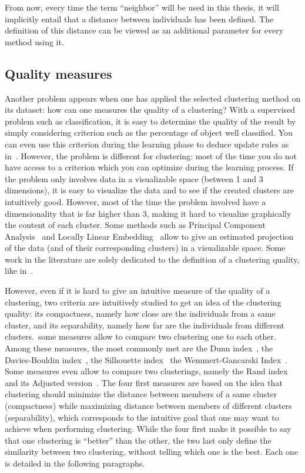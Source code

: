     From now, every time the term ``neighbor'' will be used in this thesis, it will implicitly entail that a distance between individuals has been defined. The definition of this distance can be viewed as an additional parameter for every method using it.

    \subsection{Quality measures}
\label{sec:quality_measures}
    Another problem appears when one has applied the selected clustering method on its dataset: how can one measures the quality of a clustering? With a supervised problem such as classification, it is easy to determine the quality of the result by simply considering criterion such as the percentage of object well classified. You can even use this criterion during the learning phase to deduce update rules as in~\cite{vincent2010stacked}. However, the problem is different for clustering: most of the time you do not have access to a criterion which you can optimize during the learning process. If the problem only involves data in a visualizable space (between 1 and 3 dimensions), it is easy to visualize the data and to see if the created clusters are intuitively good. However, most of the time the problem involved have a dimensionality that is far higher than 3, making it hard to visualize graphically the content of each cluster. Some methods such as Principal Component Analysis~\cite{wold1987principal} and Locally Linear Embedding~\cite{roweis2000nonlinear} allow to give an estimated projection of the data (and of their corresponding clusters) in a visualizable space. Some work in the literature are solely dedicated to the definition of a clustering quality, like in~\cite{ben2009measures}.

    However, even if it is hard to give an intuitive measure of the quality of a clustering, two criteria are intuitively studied to get an idea of the clustering quality: its compactness, namely how close are the individuals from a same cluster, and its separability, namely how far are the individuals from different clusters.\ some measures allow to compare two clustering one to each other. Among these measures, the most commonly met are the Dunn index~\cite{dunn1973fuzzy}, the Davies-Bouldin index~\cite{davies1979cluster}, the Silhouette index~\cite{rousseeuw1987silhouettes} the Wemmert-Gancarski Index~\cite{wemmert2000classification}. Some measures even allow to compare two clusterings, namely the Rand index~\cite{rand1971objective} and its Adjusted version~\cite{hubert1985comparing}. The four first measures are based on the idea that clustering should minimize the distance between members of a same cluster (compactness) while maximizing distance between members of different clusters (separability), which corresponds to the intuitive goal that one may want to achieve when performing clustering.  While the four first make it possible to say that one clustering is ``better'' than the other, the two last only define the similarity between two clustering, without telling which one is the best. Each one is detailed in the following paragraphs.

